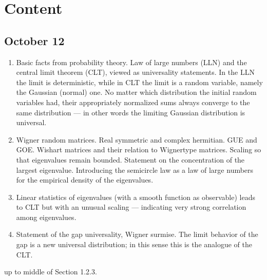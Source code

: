 \documentclass[letterpaper,10pt,english]{sphinxhowto}
\begin{document}
\section{Content}
\label{\detokenize{teaching/random_matrices_2017:content}}

\subsection{October 12}
\label{\detokenize{teaching/random_matrices_2017:october-12}}\begin{enumerate}
%
\item {} 
\sphinxAtStartPar
Basic facts from probability theory. Law of large numbers (LLN) and the central limit theorem (CLT), viewed as universality statements. In the LLN the limit is deterministic, while in CLT the limit is a random variable, namely the Gaussian (normal) one. No matter which distribution the initial random variables had, their appropriately normalized sums always converge to the same distribution — in other words the limiting Gaussian distribution is universal.

\item {} 
\sphinxAtStartPar
Wigner random matrices. Real symmetric and complex hermitian. GUE and GOE.  Wishart matrices and their relation to Wigner\sphinxhyphen{}type matrices. Scaling so that eigenvalues remain bounded. Statement on the concentration of the largest eigenvalue. Introducing the semicircle law as a law of large numbers for the empirical density of the eigenvalues.

\item {} 
\sphinxAtStartPar
Linear statistics of eigenvalues (with a smooth function as observable) leads to CLT but with an unusual scaling — indicating very strong correlation among eigenvalues.

\item {} 
\sphinxAtStartPar
Statement of the gap universality, Wigner surmise. The limit behavior of the gap is a new universal distribution; in this sense this is the analogue of the CLT.

\end{enumerate}

\sphinxAtStartPar
{}  up to middle of Section 1.2.3.
\end{document}
